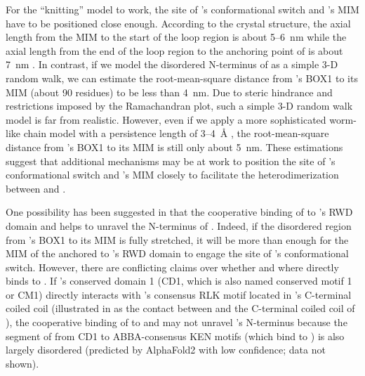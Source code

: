 For the ``knitting'' model to work, the site of 's conformational switch and 's MIM have to be positioned close enough. According to the crystal structure, the axial length from the MIM to the start of the loop region is about 5--\SI{6}{nm} while the axial length from the end of the loop region to the anchoring point of  is about \SI{7}{nm} \cite{TemplateModel, Ji2017eLife, BUB1-CDC20-MAD1, Structure1GO4, Structure4DZO}. In contrast, if we model the disordered N-terminus of  as a simple 3-D random walk, we can estimate the root-mean-square distance from 's BOX1 to its MIM (about 90 residues) to be less than \SI{4}{nm}. Due to steric hindrance and restrictions imposed by the Ramachandran plot, such a simple 3-D random walk model is far from realistic. However, even if we apply a more sophisticated worm-like chain model with a persistence length of 3--\SI{4}{\angstrom} \cite{RandomWalk3D-WormLikeChain}, the root-mean-square distance from 's BOX1 to its MIM is still only about \SI{5}{nm}. These estimations suggest that additional mechanisms may be at work to position the site of 's conformational switch and 's MIM closely to facilitate the heterodimerization between  and .

One possibility has been suggested in \cite{BUB1-CDC20-MAD1, Tripartite} that the cooperative binding of  to 's RWD domain and  helps to unravel the N-terminus of . Indeed, if the disordered region from 's BOX1 to its MIM is fully stretched, it will be more than enough for the MIM of the  anchored to 's RWD domain to engage the site of 's conformational switch. However, there are conflicting claims over whether and where  directly binds to  \cite{Ji2017eLife, BUB1-CDC20-MAD1, BUB1CD1-MAD1CStructure}. If 's conserved domain 1 (CD1, which is also named conserved motif 1 or CM1) directly interacts with 's consensus RLK motif located in 's C-terminal coiled coil \cite{Ji2017eLife, BUB1CD1-MAD1CStructure} (illustrated in  as the contact between  and the C-terminal coiled coil of ), the cooperative binding of  to  and  may not unravel 's N-terminus because the segment of  from CD1 to ABBA-consensus KEN motifs (which bind to  \cite{BUB1-CDC20-MAD1, CDC20-KEN, ABBA}) is also largely disordered (predicted by AlphaFold2 with low confidence; data not shown).

